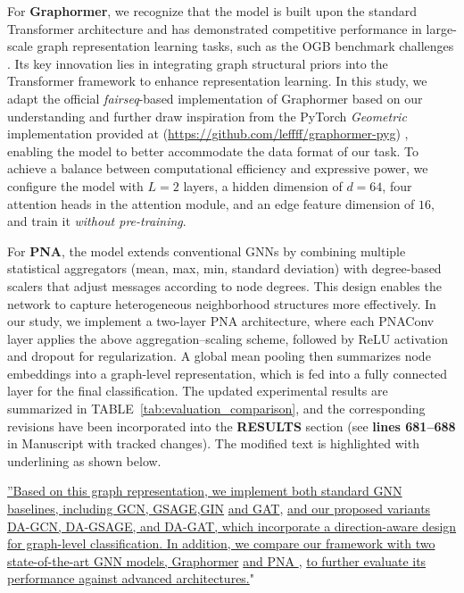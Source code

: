 \documentclass[12pt,technote,onecolumn]{IEEEtran}
\begin{document}
For \textbf{Graphormer}, we recognize that the model is built upon the standard Transformer architecture and has demonstrated competitive performance in large-scale graph representation learning tasks, such as the OGB benchmark challenges \cite{hu2021ogb}. Its key innovation lies in integrating graph structural priors into the Transformer framework to enhance representation learning. In this study, we adapt the official \textit{fairseq}-based implementation of Graphormer based on our understanding and further draw inspiration from the PyTorch \textit{Geometric} implementation provided at (\url{https://github.com/leffff/graphormer-pyg})
, enabling the model to better accommodate the data format of our task. To achieve a balance between computational efficiency and expressive power, we configure the model with $L=2$ layers, a hidden dimension of $d=64$, four attention heads in the attention module, and an edge feature dimension of $16$, and train it \textit{without pre-training}.

For \textbf{PNA}, the model extends conventional GNNs by combining multiple statistical aggregators (mean, max, min, standard deviation) with degree-based scalers that adjust messages according to node degrees. This design enables the network to capture heterogeneous neighborhood structures more effectively. In our study, we implement a two-layer PNA architecture, where each PNAConv layer applies the above aggregation–scaling scheme, followed by ReLU activation and dropout for regularization. A global mean pooling then summarizes node embeddings into a graph-level representation, which is fed into a fully connected layer for the final classification.
The updated experimental results are summarized in TABLE~\ref{tab:evaluation_comparison}, and the corresponding revisions have been incorporated into the \textbf{RESULTS} section (see \textbf{lines 681–688} in Manuscript with tracked changes). The modified text is highlighted with underlining as shown below.

\uline{”Based on this graph representation, we implement both standard GNN baselines, including GCN, GSAGE}\cite{hamilton2017inductive},\uline{GIN}\cite{xu2018powerful} \uline{and GAT}\cite{velivckovic2017graph}, \uline{and our proposed variants DA-GCN, DA-GSAGE, and DA-GAT, which incorporate a direction-aware design for graph-level classification. In addition, we compare our framework with two state-of-the-art GNN models, Graphormer} \cite{shi2022benchmarking,ying2021do} \uline{and PNA }\cite{corso2020principal}, \uline{to further evaluate its performance against advanced architectures.}"
\end{document}
